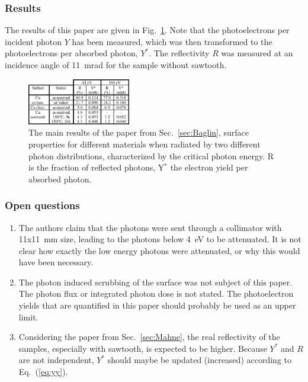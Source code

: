 \subsubsection{Results}
The results of this paper are given in Fig.~\ref{fig:baglin_table}.
Note that the photoelectrons per incident photon $Y$ has been measured, which was then transformed to the photoelectrons per absorbed photon, $Y^*$.
The reflectivity $R$ was measured at an incidence angle of 11~mrad for the sample without sawtooth.


\begin{figure}[tbh]
    \centering
    \includegraphics[width=0.4\textwidth]{../ss/baglin_table.png}
    \caption{
        The main results of the paper from Sec.~\ref{sec:Baglin}, surface properties for different materials when radiated by two different photon distributions, characterized by the critical photon energy. 
        R is the fraction of reflected photons, Y$^*$ the electron yield per absorbed photon.}
    \label{fig:baglin_table}
\end{figure}

\subsubsection{Open questions}
\begin{enumerate}
    \item
        The authors claim that the photons were sent through a collimator with 11x11~mm size, leading to the photons below 4~eV to be attenuated.
        It is not clear how exactly the low energy photons were attenuated, or why this would have been necessary.
    \item
        The photon induced scrubbing of the surface was not subject of this paper.
        The photon flux or integrated photon dose is not stated.
        The photoelectron yields that are quantified in this paper should probably be used as an upper limit.
    \item
        Considering the paper from Sec.~\ref{sec:Mahne}, the real reflectivity of the samples, especially with sawtooth, is expected to be higher.
        Because $Y^*$ and $R$ are not independent, $Y^*$ should maybe be updated (increased) according to Eq.~(\ref{eq:yy}).
\end{enumerate}

